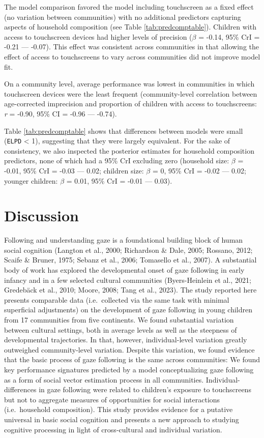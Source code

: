 \documentclass[
  man,floatsintext]{apa7}
\begin{document}
The model comparison favored the model including touchscreen as a fixed effect (no variation between communities) with no additional predictors capturing aspects of household composition (see Table \ref{tab:predcomptable}). Children with access to touchscreen devices had higher levels of precision (\(\beta\) = -0.14, 95\% CrI = -0.21 --- -0.07). This effect was consistent across communities in that allowing the effect of access to touchscreens to vary across communities did not improve model fit.

On a community level, average performance was lowest in communities in which touchscreen devices were the least frequent (community-level correlation between age-corrected imprecision and proportion of children with access to touchscreens: \emph{r} = -0.90, 95\% CI = -0.96 --- -0.74).

Table \ref{tab:predcomptable} shows that differences between models were small (\texttt{ELPD} \textless{} 1), suggesting that they were largely equivalent. For the sake of consistency, we also inspected the posterior estimates for household composition predictors, none of which had a 95\% CrI excluding zero (household size: \(\beta\) = -0.01, 95\% CrI = -0.03 --- 0.02; children size: \(\beta\) = 0, 95\% CrI = -0.02 --- 0.02; younger children: \(\beta\) = 0.01, 95\% CrI = -0.01 --- 0.03).

\hypertarget{discussion}{%
\section{Discussion}\label{discussion}}

Following and understanding gaze is a foundational building block of human social cognition (Langton et al., 2000; Richardson \& Dale, 2005; Rossano, 2012; Scaife \& Bruner, 1975; Sebanz et al., 2006; Tomasello et al., 2007). A substantial body of work has explored the developmental onset of gaze following in early infancy and in a few selected cultural communities (Byers-Heinlein et al., 2021; Gredebäck et al., 2010; Moore, 2008; Tang et al., 2023). The study reported here presents comparable data (i.e.~collected via the same task with minimal superficial adjustments) on the development of gaze following in young children from 17 communities from five continents. We found substantial variation between cultural settings, both in average levels as well as the steepness of developmental trajectories. In that, however, individual-level variation greatly outweighed community-level variation. Despite this variation, we found evidence that the basic process of gaze following is the same across communities: We found key performance signatures predicted by a model conceptualizing gaze following as a form of social vector estimation process in all communities. Individual-differences in gaze following were related to children's exposure to touchscreens but not to aggregate measures of opportunities for social interactions (i.e.~household composition). This study provides evidence for a putative universal in basic social cognition and presents a new approach to studying cognitive processing in light of cross-cultural and individual variation.
\end{document}
